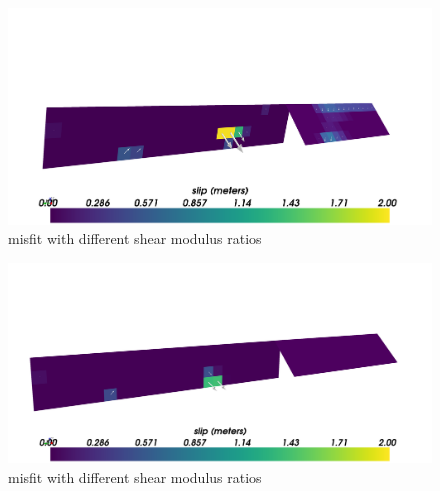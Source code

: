 \documentclass[12pt]{article}
\begin{document}
\begin{figure}
\includegraphics[scale=0.1]{Figures/final_afterslip_1-3}
\centering 
\caption{misfit with different shear modulus ratios}
\label{ShearRatio}
\end{figure} 

\begin{figure}
\includegraphics[scale=0.1]{Figures/final_afterslip_3-5}
\centering 
\caption{misfit with different shear modulus ratios}
\label{ShearRatio}
\end{figure} 
\end{document}
